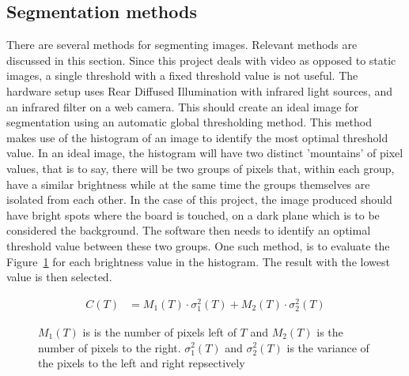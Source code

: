 \subsection{Segmentation methods}
There are several methods for segmenting images. Relevant methods are discussed in this section. Since this project deals with video as opposed to static images, a single threshold with a fixed threshold value is not useful. The hardware setup uses Rear Diffused Illumination with infrared light sources, and an  infrared filter on a web camera. This should create an ideal image for segmentation using an automatic global thresholding method. This method makes use of the histogram of an image to identify the most optimal threshold value\citep{Moeslund2012c4}. In an ideal image, the histogram will have two distinct 'mountains' of pixel values, that is to say, there will be two groups of pixels that, within each group, have a similar brightness while at the same time the groups themselves are isolated from each other. In the case of this project, the image produced should have bright spots where the board is touched, on a dark plane which is to be considered the background. The software then needs to identify an optimal threshold value between these two groups. One such method, is to evaluate the Figure~\ref{eq:otsu} for each brightness value in the histogram. The result with the lowest value is then selected.
\begin{figure}[h]
	\begin{align}
	C(T)&=M_1(T)\cdot\sigma_1^2(T)+M_2(T)\cdot\sigma_2^2(T)
	\end{align}
	\caption{$M_1(T)$ is is the number of pixels left of $T$ and $M_2(T)$ is the number of pixels to the right. $\sigma_1^2(T)$ and $\sigma_2^2(T)$ is the variance of the pixels to the left and right repsectively \label{eq:otsu} \citep[p. 61]{moeslund_introduction_2012_chapter_5}}
\end{figure}

